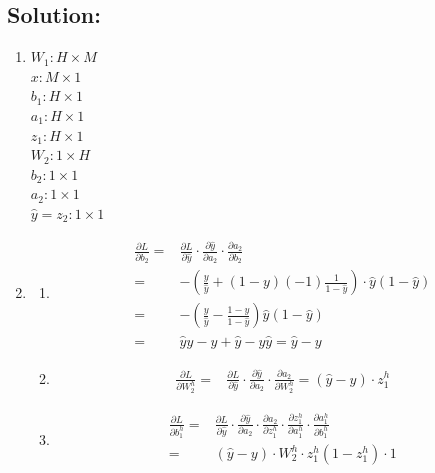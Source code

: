 \documentclass[submit]{harvardml}
\begin{document}
\subsection*{Solution:}
\begin{enumerate}
    \item 
    $W_1: H \times M$\\
    $x: M \times 1$\\
    $b_1 : H \times 1$\\
    $a_1 : H\times 1$\\
    $z_1 : H\times 1$\\
    $W_2 : 1 \times H$\\
    $b_2 : 1 \times 1$\\
    $a_2 : 1 \times 1$\\
    $\hat{y} = z_2 : 1 \times 1$\\
    \item
    \begin{enumerate}
        \item 
        \begin{align*}
            \frac{\partial L}{\partial b_2} =& \frac{\partial L}{\partial \hat{y}} \cdot \frac{\partial \hat{y}}{\partial a_2} \cdot \frac{\partial a_2}{\partial b_2}\\
            =& - (\frac{y}{\hat{y}} + (1-y)(-1)\frac{1}{1-\hat{y}})\cdot \hat{y}(1-\hat{y})\\
            =&-(\frac{y}{\hat{y}} - \frac{1-y}{1-\hat{y}})\hat{y}(1-\hat{y})\\
            =&\hat{y}y - y + \hat{y}  - y\hat{y} = \boxed{\hat{y}-y}
        \end{align*}
        \item
        \begin{align*}
            \frac{\partial L}{\partial W_2^h} =& \frac{\partial L}{\partial \hat{y}} \cdot \frac{\partial \hat{y}}{\partial a_2} \cdot \frac{\partial a_2}{\partial W_2^h}
            = \boxed{(\hat{y}-y)\cdot z_1^h} 
        \end{align*}
        \item
        \begin{align*}
            \frac{\partial L}{\partial b_1^h} =& \frac{\partial L}{\partial \hat{y}} \cdot \frac{\partial \hat{y}}{\partial a_2} \cdot \frac{\partial a_2}{\partial z_1^h} \cdot
            \frac{\partial z_1^h}{\partial a_1^h} \cdot
            \frac{\partial a_1^h}{\partial b_1^h}\\
            =&(\hat{y}-y)\cdot W_2^h \cdot z_1^h (1-z_1^h) \cdot 1\\

\end{align*}
\end{enumerate}
\end{enumerate}
\end{document}
